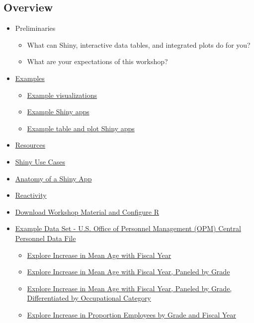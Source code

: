 \documentclass[10pt, letterpaper]{article}
\begin{document}
\begin{spacing}{1.0}

\section{Overview}

\begin{itemize}
    \item Preliminaries
      \begin{itemize}
        \item What can Shiny, interactive data tables, and integrated plots do for you?
        \item What are your expectations of this workshop?
      \end{itemize}
    \item \hyperref[sec:examples]{Examples}
      \begin{itemize}
          \item \hyperref[sec:examplevis]{Example visualizations}
          \item \hyperref[sec:exampleapps]{Example Shiny apps}
          \item \hyperref[sec:examplesDT]{Example table and plot Shiny apps}
      \end{itemize}
    \item \hyperref[sec:resources]{Resources}
    \item \hyperref[sec:usecases]{Shiny Use Cases}
    \item \hyperref[sec:anatomyofapp]{Anatomy of a Shiny App}
    \item \hyperref[sec:reactivity]{Reactivity}
    \item \hyperref[sec:accesworkshopmaterial]{Download Workshop Material and Configure R}
    \item \hyperref[sec:exampledataset]{Example Data Set - U.S. Office of Personnel Management (OPM) Central Personnel Data File}
    \begin{itemize}
      \item \hyperref[sec:motivation01]{Explore Increase in Mean Age with Fiscal Year}
      \item \hyperref[sec:motivation02]{Explore Increase in Mean Age with Fiscal Year, Paneled by Grade}
      \item \hyperref[sec:motivation03]{Explore Increase in Mean Age with Fiscal Year, Paneled by Grade, Differentiated by Occupational Category}
      \item \hyperref[sec:motivation04]{Explore Increase in Proportion Employees by Grade and Fiscal Year}

\end{itemize}
\end{itemize}
\end{spacing}
\end{document}
